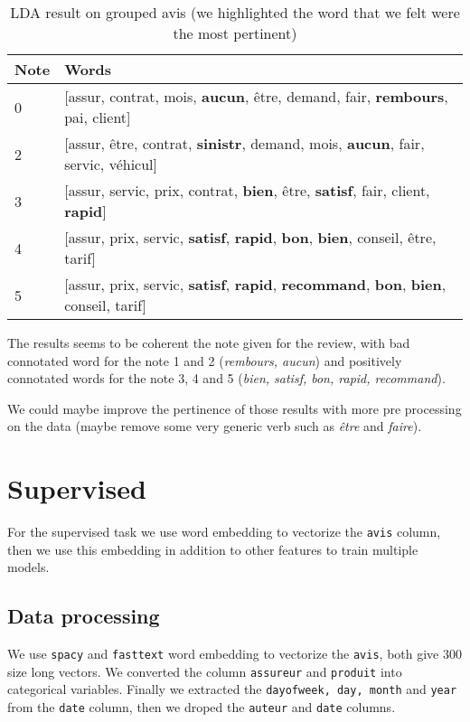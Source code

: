 \documentclass[a4paper, 12pt, one column]{article}
\begin{document}
\begin{table}[H]
\centering
\begin{tabular}{|p{1cm}|p{13cm}|}
\hline
\textbf{Note} & \textbf{Words} \\
\hline
    0 &    [assur, contrat, mois, \textbf{aucun}, être, demand, fair, \textbf{rembours}, pai, client] \\
    2 & [assur, être, contrat, \textbf{sinistr}, demand, mois, \textbf{aucun}, fair, servic, véhicul] \\
    3 &     [assur, servic, prix, contrat, \textbf{bien}, être, \textbf{satisf}, fair, client, \textbf{rapid}] \\
    4 &       [assur, prix, servic, \textbf{satisf}, \textbf{rapid}, \textbf{bon}, \textbf{bien}, conseil, être, tarif] \\
    5 &  [assur, prix, servic, \textbf{satisf}, \textbf{rapid}, \textbf{recommand}, \textbf{bon}, \textbf{bien}, conseil, tarif] \\
\hline
\end{tabular}
\label{tab:unsupervised_split}
\caption{LDA result on grouped avis (we highlighted the word that we felt were the most pertinent)}
\end{table}

The results seems to be coherent the note given for the review, with bad connotated word for the note 1 and 2 (\textit{rembours, aucun}) and positively connotated words for the note 3, 4 and 5 (\textit{bien, satisf, bon, rapid, recommand}).

We could maybe improve the pertinence of those results with more pre processing on the data (maybe remove some very generic verb such as \textit{être} and \textit{faire}).

\newpage
\section{Supervised}

For the supervised task we use word embedding to vectorize the \lstinline{avis} column, then we use this embedding in addition to other features to train multiple models.

\subsection{Data processing}

We use \lstinline{spacy} and \lstinline{fasttext} word embedding to vectorize the \lstinline{avis}, both give 300 size long vectors.
We converted the column \lstinline{assureur} and \lstinline{produit} into categorical variables.
Finally we extracted the \lstinline{dayofweek, day, month} and \lstinline{year} from the \lstinline{date} column, then we droped the \lstinline{auteur} and \lstinline{date} columns.
\end{document}
